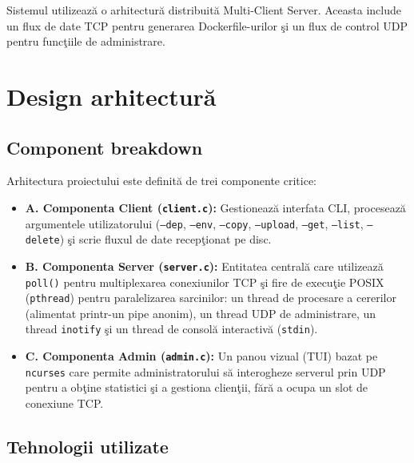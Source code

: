 \documentclass[12pt, a4paper]{article}
\begin{document}
Sistemul utilizeaz\u{a} o arhitectur\u{a} distribuit\u{a} Multi-Client Server. Aceasta include un flux
de date TCP pentru generarea Dockerfile-urilor \c{s}i un flux de control UDP pentru func\c{t}iile de
administrare.

\section{Design arhitectur\u{a}}

\subsection*{Component breakdown}

Arhitectura proiectului este definit\u{a} de trei componente critice:

\begin{itemize}
    \item \textbf{A. Componenta Client (\texttt{client.c}):} Gestioneaz\u{a} interfata CLI, proceseaz\u{a}
    argumentele utilizatorului (\texttt{--dep}, \texttt{--env}, \texttt{--copy}, \texttt{--upload},
    \texttt{--get}, \texttt{--list}, \texttt{--delete}) \c{s}i scrie fluxul de date recep\c{t}ionat pe disc.

    \item \textbf{B. Componenta Server (\texttt{server.c}):} Entitatea central\u{a} care utilizeaz\u{a}
    \texttt{poll()} pentru multiplexarea conexiunilor TCP \c{s}i fire de execu\c{t}ie POSIX
    (\texttt{pthread}) pentru paralelizarea sarcinilor: un thread de procesare a cererilor (alimentat
    printr-un pipe anonim), un thread UDP de administrare, un thread \texttt{inotify} \c{s}i un thread
    de consol\u{a} interactiv\u{a} (\texttt{stdin}).

    \item \textbf{C. Componenta Admin (\texttt{admin.c}):} Un panou vizual (TUI) bazat pe
    \texttt{ncurses} care permite administratorului s\u{a} interogheze serverul prin UDP pentru a
    ob\c{t}ine statistici \c{s}i a gestiona clien\c{t}ii, f\u{a}r\u{a} a ocupa un slot de conexiune TCP.
\end{itemize}

\subsection*{Tehnologii utilizate}
\end{document}
